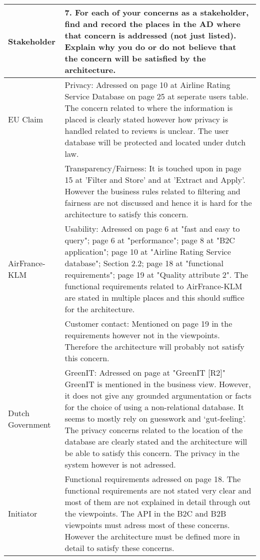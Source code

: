 \begin{longtable}{| l | p{13cm} |}
  \hline
  \textbf{Stakeholder} & \textbf{7. For each of your concerns as a stakeholder, find and record the places in the AD where that concern is addressed (not just listed). Explain why you do or do not believe that the concern will be satisfied by the architecture.} \\
  \hline
  EU Claim & Privacy: Adressed on page 10 at Airline Rating Service Database on page 25 at seperate users table. The concern related to where the information is placed is clearly stated however how privacy is handled related to reviews is unclear. The user database will be protected and located under dutch law. \\
    & Transparency/Fairness: It is touched upon in page 15 at 'Filter and Store' and at 'Extract and Apply'. However the business rules related to filtering and fairness are not discussed and hence it is hard for the architecture to satisfy this concern. \\
  \hline
  AirFrance-KLM & Usability: Adressed on page 6 at "fast and easy to query"; page 6 at "performance"; page 8 at "B2C application"; page 10 at "Airline Rating Service database"; Section 2.2;  page 18 at "functional requirements"; page 19 at "Quality attribute 2". \newline
  The functional requirements related to AirFrance-KLM are stated in multiple places and this should suffice for the architecture. \\ 
    & Customer contact: Mentioned on page 19 in the requirements however not in the viewpoints. Therefore the architecture will probably not satisfy this concern.  \\
  \hline
  Dutch Government & GreenIT: Adressed on page at "GreenIT [R2]" \newline
  GreenIT is mentioned in the business view. However, it does not give any grounded argumentation or facts for the choice of using a non-relational database. It seems to mostly rely on guesswork and ‘gut-feeling’. The privacy concerns related to the location of the database are clearly stated and the architecture will be able to satisfy this concern. The privacy in the system however is not adressed. \\
  \hline
  Initiator & Functional requirements adressed on page 18. \newline
  The functional requirements are not stated very clear and most of them are not explained in detail through out the viewpoints. The API in the B2C and B2B viewpoints must adress most of these concerns. However the architecture must be defined more in detail to satisfy these concerns. \\
  \hline


\end{longtable}

